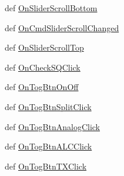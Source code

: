 \begin{DoxyCompactItemize}
\item 
def \hyperlink{classtop_frame_1_1_top_frame_a9106ef59ae91848ffb4cb6760d0d31b7}{On\-Slider\-Scroll\-Bottom}
\item 
def \hyperlink{classtop_frame_1_1_top_frame_ade2fe0135a6d86ac58975b6a8954c707}{On\-Cmd\-Slider\-Scroll\-Changed}
\item 
def \hyperlink{classtop_frame_1_1_top_frame_a9dbb5d6103ce150d8f14392bbcc20b8b}{On\-Slider\-Scroll\-Top}
\item 
def \hyperlink{classtop_frame_1_1_top_frame_ae4a6dc0ac56bc139353b940dbb677d8f}{On\-Check\-S\-Q\-Click}
\item 
def \hyperlink{classtop_frame_1_1_top_frame_ad3f6353b870c7f494c54bacd2ed9d790}{On\-Tog\-Btn\-On\-Off}
\item 
def \hyperlink{classtop_frame_1_1_top_frame_a50f7687dbc30474392e57da99defc206}{On\-Tog\-Btn\-Split\-Click}
\item 
def \hyperlink{classtop_frame_1_1_top_frame_a3c44ab74c19101b09c6cf771bcb7b3ab}{On\-Tog\-Btn\-Analog\-Click}
\item 
def \hyperlink{classtop_frame_1_1_top_frame_ad73fb7b48663c5050d5c0b4bdb962667}{On\-Tog\-Btn\-A\-L\-C\-Click}
\item 
def \hyperlink{classtop_frame_1_1_top_frame_acdb4c8f0b6e19883a0c0283bfe22e03e}{On\-Tog\-Btn\-T\-X\-Click}
\end{DoxyCompactItemize}
